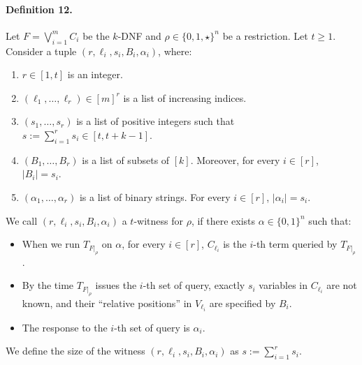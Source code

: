 \documentclass[10pt,a4paper]{article}
\begin{document}
\paragraph{Definition 12.} Let $F=\bigvee_{i=1}^mC_i$ be the $k$-DNF and $\rho\in\{0,1,\star\}^n$ be a restriction. Let $t\ge1$. Consider a tuple $(r,\ell_i,s_i,B_i,\alpha_i)$, where:
\begin{enumerate}\item $r\in[1,t]$ is an integer.
\item $(\ell_1,\ldots,\ell_r)\in[m]^r$ is a list of increasing indices.
\item $(s_1,\ldots,s_r)$ is a list of positive integers such that $s:=\sum_{i=1}^rs_i\in[t,t+k-1]$.
\item $(B_1,\ldots,B_r)$ is a list of subsets of $[k]$. Moreover, for every $i\in[r]$, $|B_i|=s_i$.
\item $(\alpha_1,\ldots,\alpha_r)$ is a list of binary strings. For every $i\in[r]$, $|\alpha_i|=s_i$.\end{enumerate}
We call $(r,\ell_i,s_i,B_i,\alpha_i)$ a $t$-witness for $\rho$, if there exists $\alpha\in\{0,1\}^n$ such that:
\begin{itemize}\item When we run $T_{F|_\rho}$ on $\alpha$, for every $i\in[r]$, $C_{\ell_i}$ is the $i$-th term queried by $T_{F|_\rho}$.
\item By the time $T_{F|_\rho}$ issues the $i$-th set of query, exactly $s_i$ variables in $C_{\ell_i}$ are not known, and their ``relative positions'' in $V_{\ell_i}$ are specified by $B_i$.
\item The response to the $i$-th set of query is $\alpha_i$.\end{itemize}
We define the size of the witness $(r,\ell_i,s_i,B_i,\alpha_i)$ as $s:=\sum_{i=1}^rs_i$.
\end{document}
